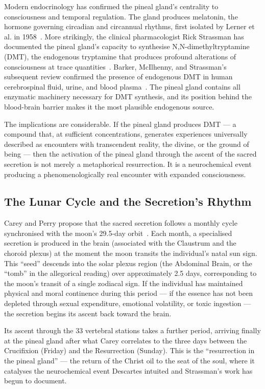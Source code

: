 \documentclass[12pt, a4paper]{article}
\begin{document}
Modern endocrinology has confirmed the pineal gland's centrality to
consciousness and temporal regulation. The gland produces melatonin, the
hormone governing circadian and circannual rhythms, first isolated by Lerner
et al. in 1958~\autocite{lerner1958}. More strikingly, the clinical pharmacologist
Rick Strassman has documented the pineal gland's capacity to synthesise
N,N-dimethyltryptamine (DMT), the endogenous tryptamine that produces
profound alterations of consciousness at trace quantities~\autocite{strassman2001}.
Barker, McIlhenny, and Strassman's subsequent review confirmed the presence
of endogenous DMT in human cerebrospinal fluid, urine, and blood
plasma~\autocite{barker2013}. The pineal gland contains all enzymatic
machinery necessary for DMT synthesis, and its position behind the
blood-brain barrier makes it the most plausible endogenous source.

The implications are considerable. If the pineal gland produces DMT — a
compound that, at sufficient concentrations, generates experiences universally
described as encounters with transcendent reality, the divine, or the ground
of being — then the activation of the pineal gland through the ascent of the
sacred secretion is not merely a metaphorical resurrection. It is a
neurochemical event producing a phenomenologically real encounter with
expanded consciousness.

\subsection{The Lunar Cycle and the Secretion's Rhythm}

Carey and Perry propose that the sacred secretion follows a monthly cycle
synchronised with the moon's 29.5-day orbit~\autocite[52]{carey1932}. Each
month, a specialised secretion is produced in the brain (associated with the
Claustrum and the choroid plexus) at the moment the moon transits the
individual's natal sun sign. This ``seed'' descends into the solar plexus
region (the Abdominal Brain, or the ``tomb'' in the allegorical reading) over
approximately 2.5 days, corresponding to the moon's transit of a single
zodiacal sign. If the individual has maintained physical and moral continence
during this period — if the essence has not been depleted through sexual
expenditure, emotional volatility, or toxic ingestion — the secretion begins
its ascent back toward the brain.

Its ascent through the 33 vertebral stations takes a further period, arriving
finally at the pineal gland after what Carey correlates to the three days
between the Crucifixion (Friday) and the Resurrection (Sunday). This is the
``resurrection in the pineal gland'' — the return of the Christ oil to the
seat of the soul, where it catalyses the neurochemical event Descartes
intuited and Strassman's work has begun to document.
\end{document}
